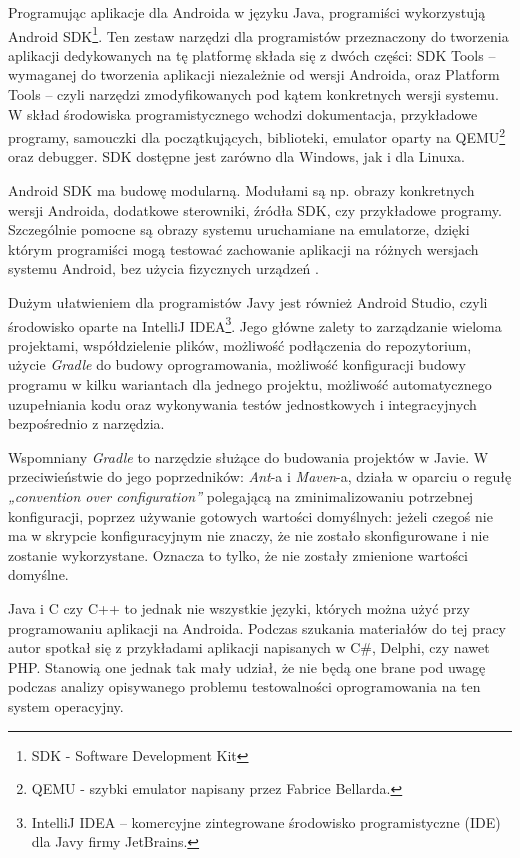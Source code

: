 Programując aplikacje dla Androida w języku Java, programiści wykorzystują Android SDK\footnote{SDK - Software Development Kit}. Ten zestaw narzędzi dla programistów przeznaczony do tworzenia aplikacji dedykowanych na tę platformę składa się z dwóch części: SDK Tools – wymaganej do tworzenia aplikacji niezależnie od wersji Androida, oraz Platform Tools – czyli narzędzi zmodyfikowanych pod kątem konkretnych wersji systemu. W skład środowiska programistycznego wchodzi dokumentacja, przykładowe programy, samouczki dla początkujących, biblioteki, emulator oparty na QEMU\footnote{QEMU - szybki emulator napisany przez Fabrice Bellarda.} oraz debugger. SDK dostępne jest zarówno dla Windows, jak i dla Linuxa.

Android SDK ma budowę modularną. Modułami są np. obrazy konkretnych wersji Androida, dodatkowe sterowniki, źródła SDK, czy przykładowe programy. Szczególnie pomocne są obrazy systemu uruchamiane na emulatorze, dzięki którym programiści mogą  testować zachowanie aplikacji na różnych wersjach systemu Android, bez użycia fizycznych urządzeń \cite{website:android:sdk}.

Dużym ułatwieniem dla programistów Javy jest również Android Studio, czyli środowisko oparte na IntelliJ IDEA\footnote{IntelliJ IDEA – komercyjne zintegrowane środowisko programistyczne (IDE) dla Javy firmy JetBrains.}. Jego główne zalety to zarządzanie wieloma projektami, współdzielenie plików, możliwość podłączenia do repozytorium, użycie \textit{Gradle} do budowy oprogramowania, możliwość konfiguracji budowy programu w kilku wariantach dla jednego projektu, możliwość automatycznego uzupełniania kodu oraz wykonywania testów jednostkowych i integracyjnych bezpośrednio z narzędzia.

Wspomniany \textit{Gradle} to narzędzie służące do budowania projektów w Javie. W przeciwieństwie do jego poprzedników: \textit{Ant}-a i \textit{Maven}-a, działa w oparciu o regułę \textit{„convention over configuration”} polegającą na zminimalizowaniu potrzebnej konfiguracji, poprzez używanie gotowych wartości domyślnych: jeżeli czegoś nie ma w skrypcie konfiguracyjnym nie znaczy, że nie zostało skonfigurowane i nie zostanie wykorzystane. Oznacza to tylko, że nie zostały zmienione wartości domyślne.

Java i C czy C++ to jednak nie wszystkie języki, których można użyć przy programowaniu aplikacji na Androida. Podczas szukania materiałów do tej pracy autor spotkał się z przykładami aplikacji napisanych w C\#, Delphi, czy nawet PHP. Stanowią one jednak tak mały udział, że nie będą one brane pod uwagę podczas analizy opisywanego problemu testowalności oprogramowania na ten system operacyjny.


